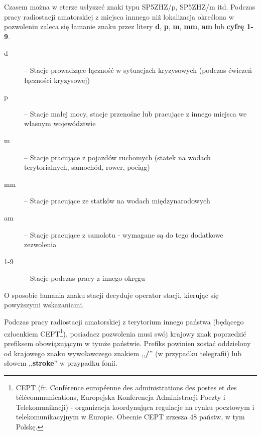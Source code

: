 \documentclass[]{mgr}
\begin{document}
            Czasem można w eterze usłyszeć znaki typu SP5ZHZ/p, SP5ZHZ/m itd. Podczas pracy radiostacji amatorskiej z miejsca innnego niż lokalizacja określona w pozwoleniu zaleca się łamanie znaku przez litery \textbf{d}, \textbf{p}, \textbf{m}, \textbf{mm}, \textbf{am} lub \textbf{cyfrę 1-9}.

            \begin{description}
                \item[d] -- Stacje prowadzące łączność w sytuacjach kryzysowych (podczas ćwiczeń łączności kryzysowej)
                \item[p] -- Stacje małej mocy, stacje przenośne lub pracujące z innego miejsca we własnym województwie
                \item[m] -- Stacje pracujące z pojazdów ruchomych (statek na wodach terytorialnych, samochód, rower, pociąg)
                \item[mm] -- Stacje pracujące ze statków na wodach międzynarodowych
                \item[am] -- Stacje pracujące z samolotu - wymagane są do tego dodatkowe zezwolenia
                \item[1-9] -- Stacje podczas pracy z innego okręgu
            \end{description}
            O sposobie łamania znaku stacji decyduje operator stacji, kierując się powyższymi wskazaniami.

            Podczas pracy radiostacji amatorskiej z terytorium innego państwa (będącego człoenkiem CEPT\footnote{CEPT (fr. Conférence européenne des administrations des postes et des télécommunications, Europejska Konferencja Administracji Poczty i Telekomunikacji) - organizacja koordynująca regulacje na rynku pocztowym i telekomunikacyjnym w Europie. Obecnie CEPT zrzesza 48 państw, w tym Polskę.}), posiadacz pozwolenia musi swój krajowy znak poprzedzić prefiksem obowiązującym w tymże państwie. Prefiks powinien zostać oddzielony od krajowego znaku wywoławczego znakiem ,,\textbf{/}'' (w przypadku telegrafii) lub słowem ,,\textbf{stroke}'' w przypadku fonii.
\end{document}
